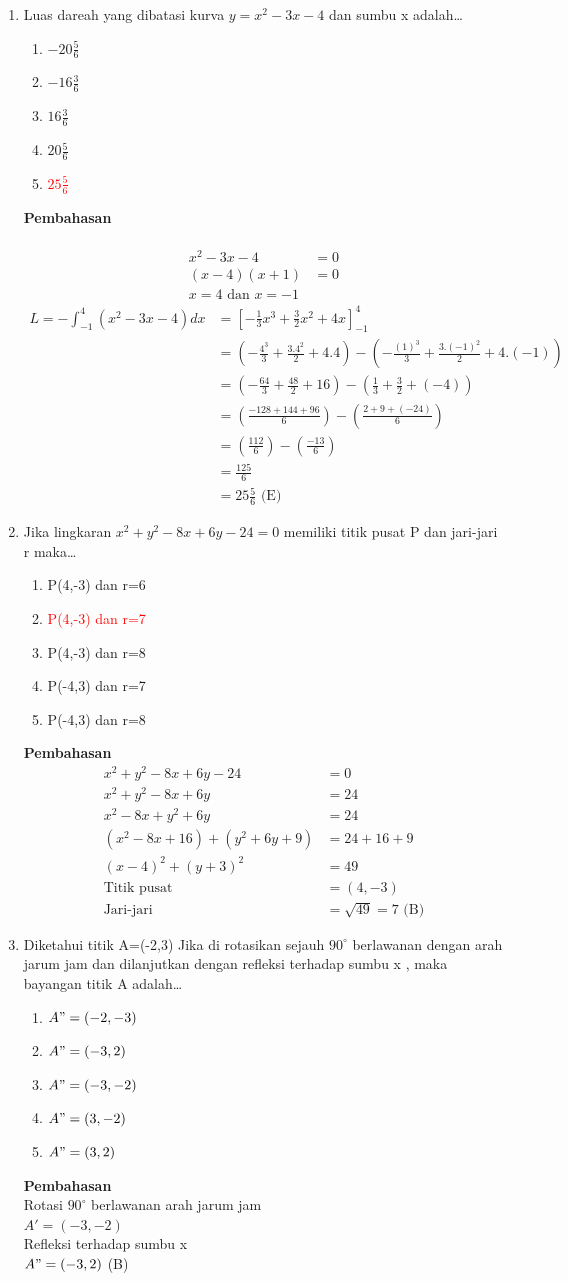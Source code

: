 \documentclass{report}
\newcommand{\options}[5]{
\begin{enumerate}[label=\alph*.]
	\item #1
	\item #2
	\item #3
	\item #4
	\item #5
\end{enumerate}
}
\newcommand{\pemb}{ \textbf{Pembahasan} \\}
\begin{document}
\begin{enumerate}
\item Luas dareah yang dibatasi kurva $y=x^2-3x-4$ dan sumbu x adalah\ldots
\options
{$-20\frac{5}{6}$}
{$-16\frac{3}{6}$}
{$16\frac{3}{6}$}
{$20\frac{5}{6}$}
{\textcolor{red}{$25\frac{5}{6}$}}
\pemb
{}\\
\begin{align*}
	  x^2-3x-4 &= 0 \\
	  (x-4)(x+1) &= 0 \\
	  x = 4 \text{ dan } x = -1
\end{align*}
\begin{align*}
L = -\int_{-1}^4\left(x^2-3x-4\right)dx 
	&= \left[-\frac{1}{3}x^3+\frac{3}{2}x^2+4x\right]_{-1}^4  \\
	&= \left(-\frac{4^3}{3}+\frac{3.4^2}{2}+4.4\right) - \left(-\frac{(1)^3}{3}+\frac{3.(-1)^2}{2}+4.(-1)\right) \\
	&= \left(-\frac{64}{3}+\frac{48}{2}+16\right) - \left(\frac{1}{3}+\frac{3}{2}+(-4)\right) \\
	&= \left(\frac{-128+144+96}{6}\right) - \left(\frac{2+9+(-24)}{6}\right) \\
	&= \left(\frac{112}{6}\right) - \left(\frac{-13}{6}\right) \\
	&= \frac{125}{6} \\
	&= 25\frac{5}{6} \text{ (E)}
\end{align*}

\item Jika lingkaran $x^2+y^2-8x+6y-24=0$ memiliki titik pusat P dan jari-jari r maka\ldots
\options
{P(4,-3) dan r=6}
{\textcolor{red}{P(4,-3) dan r=7}}
{P(4,-3) dan r=8}
{P(-4,3) dan r=7}
{P(-4,3) dan r=8}
\pemb
\begin{align*}
	x^2+y^2-8x+6y-24 &= 0 \\
	x^2+y^2-8x+6y &= 24 \\
	x^2-8x+y^2+6y &= 24 \\
	(x^2-8x+16)+(y^2+6y+9) &= 24+16+9\\
	(x-4)^2+(y+3)^2 &= 49 \\
	\text{Titik pusat} &= (4, -3) \\
	\text{Jari-jari} &= \sqrt{49} = 7 \text{ (B)}
\end{align*}

\item Diketahui titik A=(-2,3) Jika di rotasikan sejauh $90^{\circ}$ berlawanan dengan arah jarum jam dan dilanjutkan dengan refleksi terhadap sumbu x , maka bayangan titik A adalah\ldots
\options
{$A"=(-2,-3)$}
{\textcolor{red}{$A"=(-3,2)$}}
{$A"=(-3,-2)$}
{$A"=(3,-2)$}
{$A"=(3,2)$}
\pemb
Rotasi $90^{\circ}$ berlawanan arah jarum jam\\
$A'=(-3,-2)$ \\
Refleksi terhadap sumbu x \\
$A"=(-3,2)$ (B) \\


\end{enumerate}
\end{document}
